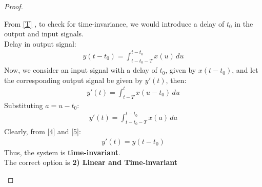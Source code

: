 \documentclass[journal,12pt,twocolumn]{IEEEtran}
\begin{document}
\begin{proof}
\begin{enumerate}
From \eqref{T} , to check for time-invariance, we would introduce a delay of $t_0$ in the output and input signals.\\
Delay in output signal:
\begin{align}
    y(t-t_0) = \int_{t-t_0-T}^{t-t_0} x(u)\,du
    \label{4}
\end{align}
Now, we consider an input signal with a delay of $t_0$, given by $x(t-t_0)$, and let the corresponding output signal be given by $y'(t)$, then:
\begin{align}
    y'(t) = \int_{t-T}^{t} x(u-t_0)\,du
\end{align}
Substituting $a = u-t_0$:
\begin{align}
    y'(t) = \int_{t-t_0-T}^{t-t_0} x(a)\,da
    \label{5}
\end{align}
Clearly, from \eqref{4} and \eqref{5}:
\begin{align}
    y'(t) = y(t-t_0)
\end{align}
Thus, the system is \textbf{time-invariant}.\\
The correct option is \textbf{2) Linear and Time-invariant}\\


\end{enumerate}
\end{proof}
\end{document}
